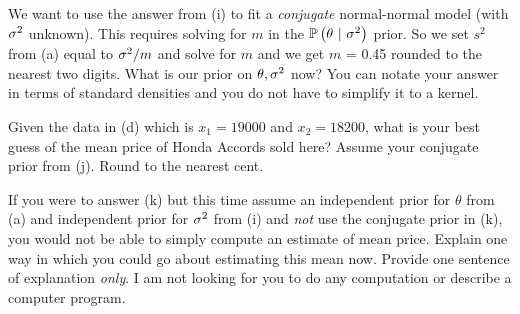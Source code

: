 \documentclass[12pt]{article}
\begin{document}
 We want to use the answer from (i) to fit a \textit{conjugate} normal-normal model (with $\sigma^2$ unknown). This requires solving for $m$ in the $\mathbb{P}\left(\theta~|~\sigma^2\right)$ prior. So we set $s^2$ from (a) equal to $\sigma^2 / m$ and solve for $m$ and we get $m$ = 0.45 rounded to the nearest two digits. What is our prior on $\theta, \sigma^2$ now? You can notate your answer in terms of standard densities and you do not have to simplify it to a kernel. 

 Given the data in (d) which is $x_1=19000$ and $x_2 = 18200$, what is your best guess of the mean price of Honda Accords sold here? Assume your conjugate prior from (j). Round to the nearest cent. 


 If you were to answer (k) but this time assume an independent prior for $\theta$ from (a) and independent prior for $\sigma^2$ from (i) and \textit{not} use the conjugate prior in (k), you would not be able to simply compute an estimate of mean price. Explain one way in which you could go about estimating this mean now. Provide one sentence of explanation \textit{only}. I am not looking for you to do any computation or describe a computer program. 


\eenum
\end{document}
